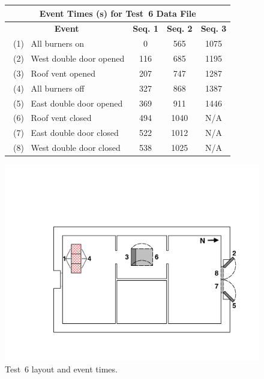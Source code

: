 \documentclass[12pt,oneside]{book}
\begin{document}
\begin{figure}[!ht]
\begin{minipage}[b]{0.8\columnwidth}
	\begin{flushleft}
	\begin{tabular}{lccc}
	\multicolumn{4}{c}{\normalsize Event Times (s) for Test~6 Data File} \\
	\toprule
	\multicolumn{1}{c}{\textbf{Event}} 	& \textbf{Seq. 1}	& \textbf{Seq. 2} 	& \textbf{Seq. 3} 	\\
	\midrule
	~(1)~ All burners on 				&	0				&	565				&	1075			\\
	~(2)~ West double door opened 		&	116				&   685				&	1195			\\
	~(3)~ Roof vent opened 		    	&	207				&	747 			& 	1287 			\\
	~(4)~ All burners off 				&	327				&   868				&	1387			\\
	~(5)~ East double door opened		&	369				&   911				&	1446			\\
	~(6)~ Roof vent closed 				&	494				&   1040			&	N/A				\\
	~(7)~ East double door closed		&	522 			&	1012			&	N/A 			\\
	~(8)~  West double door closed		&	538 			&	1025			&	N/A				\\
	\bottomrule
	\end{tabular}
	\end{flushleft}
\end{minipage}
\begin{minipage}[b]{0.86\columnwidth}
	\vspace{15pt}
	\centering
	\includegraphics[width=\columnwidth]{../Figures/Floor_Plans/East_Structure_Test_6}
\end{minipage}
\caption{Test~6 layout and event times.}
\label{fig:east_test_6}
\end{figure}
\clearpage
\end{document}

